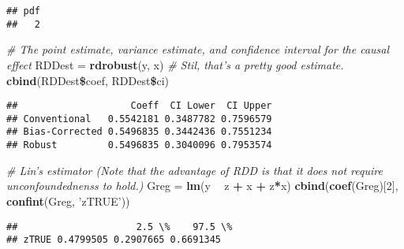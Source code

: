 \documentclass[]{article}
\newenvironment{Shaded}{\begin{snugshade}}{\end{snugshade}}
\newcommand{\KeywordTok}[1]{\textcolor[rgb]{0.13,0.29,0.53}{\textbf{#1}}}
\newcommand{\DecValTok}[1]{\textcolor[rgb]{0.00,0.00,0.81}{#1}}
\newcommand{\StringTok}[1]{\textcolor[rgb]{0.31,0.60,0.02}{#1}}
\newcommand{\CommentTok}[1]{\textcolor[rgb]{0.56,0.35,0.01}{\textit{#1}}}
\newcommand{\OperatorTok}[1]{\textcolor[rgb]{0.81,0.36,0.00}{\textbf{#1}}}
\newcommand{\NormalTok}[1]{#1}
\begin{document}
\begin{verbatim}
## pdf 
##   2
\end{verbatim}

\begin{Shaded}
\begin{Highlighting}[]
\CommentTok{# The point estimate, variance estimate, and confidence interval for the causal effect}
\NormalTok{RDDest =}\StringTok{ }\KeywordTok{rdrobust}\NormalTok{(y, x)}
\CommentTok{# Stil, that's a pretty good estimate.}
\KeywordTok{cbind}\NormalTok{(RDDest}\OperatorTok{\$}\NormalTok{coef, RDDest}\OperatorTok{\$}\NormalTok{ci)}
\end{Highlighting}
\end{Shaded}

\begin{verbatim}
##                    Coeff  CI Lower  CI Upper
## Conventional   0.5542181 0.3487782 0.7596579
## Bias-Corrected 0.5496835 0.3442436 0.7551234
## Robust         0.5496835 0.3040096 0.7953574
\end{verbatim}

\begin{Shaded}
\begin{Highlighting}[]
\CommentTok{# Lin's estimator (Note that the advantage of RDD is that it does not require unconfoundednenss to hold.)}
\NormalTok{Greg =}\StringTok{ }\KeywordTok{lm}\NormalTok{(y }\OperatorTok{~}\StringTok{ }\NormalTok{z }\OperatorTok{+}\StringTok{ }\NormalTok{x }\OperatorTok{+}\StringTok{ }\NormalTok{z}\OperatorTok{*}\NormalTok{x)}
\KeywordTok{cbind}\NormalTok{(}\KeywordTok{coef}\NormalTok{(Greg)[}\DecValTok{2}\NormalTok{], }\KeywordTok{confint}\NormalTok{(Greg, }\StringTok{'zTRUE'}\NormalTok{))}
\end{Highlighting}
\end{Shaded}

\begin{verbatim}
##                     2.5 \%    97.5 \%
## zTRUE 0.4799505 0.2907665 0.6691345
\end{verbatim}
\end{document}
